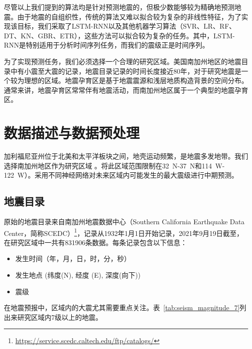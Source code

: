 尽管以上我们提到的算法均是针对预测地震的，但极少数能够较为精确地预测地震。由于地震的自组织性，传统的算法又难以拟合较为复杂的非线性特征，为了实现该目标，我们采取了LSTM-RNN\citep{Wang2017Earthquake,Bhatia2018EARTHQUAKE,berhich2020lstm}以及其他机器学习算法（SVR、LR、RF、DT、KN、GBR、ETR），这些方法可以拟合较为复杂的任务。其中，LSTM-RNN是特别适用于分析时间序列任务，而我们的震级正是时间序列\cite{Morales2010Pattern,Werner2009High}。

为了实现预测任务，我们必须选择一个合理的研究区域。美国南加州地区的地震目录中有小震至大震的记录，地震目录记录的时间长度接近80年，对于研究地震是一个较为理想的区域。地震孕育区是基于地震震源和浅层地质构造背景的空间分布。通常来讲，地震孕育区常常伴有地震活动，而南加州地区属于一个典型的地震孕育区。

\section{数据描述与数据预处理\label{sec_seism:数据描述与数据预处理}}

加利福尼亚州位于北美和太平洋板块之间，地壳运动频繁，是地震多发地带。我们选择南加州地区作为研究区域
。将此区域范围限制在\SI{32}{N}-\SI{37}{N}和\SI{114}{W}-\SI{122}{W}）。采用不同神经网络对未来区域内可能发生的最大震级进行中期预测。


\subsection{地震目录}\label{subsec_seism:地震目录}

原始的地震目录来自南加州地震数据中心（Southern California Earthquake Data Center，简称SCEDC）\footnote{\href{https://service.scedc.caltech.edu/ftp/catalogs/}{https://service.scedc.caltech.edu/ftp/catalogs/}}，记录从1932年1月1日开始记录，2021年9月19日截至，在研究区域中一共有831906条数据。每条记录包含以下信息：
\begin{itemize}
\item[1] 发生时间（年，月，日，时，分，秒）
\item[2] 发生地点 (纬度(N), 经度 (E), 深度(向下))
\item[3] 震级
\end{itemize}
在地震预报中，区域内的大震尤其需要重点关注。表~\ref{tab:seism_magnitude_7}列出来研究区域内7级以上的地震。

